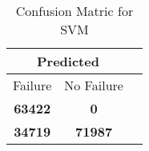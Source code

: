 \begin{table}[] 
\caption{Confusion Matric for SVM} 
\label{Table: Prediction Accuracy-NoneSVMSVMEKF-ignoresolarPanelDipole-solarPanelDipole} 
\centering 
\begin{tabular} 
 {@{}ccc@{}} 
\toprule 
\multicolumn{2}{c}{\textbf{Predicted}}
 \\ \midrule 
\multicolumn{1}{|c|}{Failure} & 
\multicolumn{1}{c|}{No Failure}
 \\ \midrule 
\multicolumn{1}{|c|}{\color{green}\textbf{63422}} & 
\multicolumn{1}{c|}{\color{red}\textbf{0}}
 \\ \midrule 
\multicolumn{1}{|c|}{\color{red}\textbf{34719}} & 
\multicolumn{1}{c|}{\color{green}\textbf{71987}}
 \\ \bottomrule 
\end{tabular} 
\end{table} 
